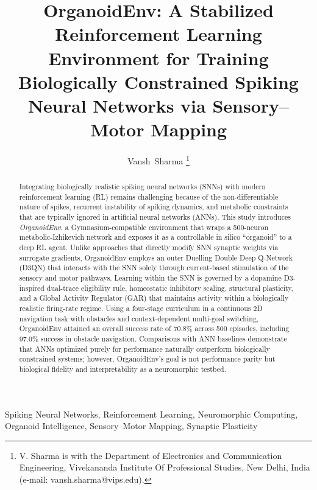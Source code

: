 \documentclass[journal]{IEEEtran}
\begin{document}
\title{OrganoidEnv: A Stabilized Reinforcement Learning Environment for Training Biologically Constrained Spiking Neural Networks via Sensory--Motor Mapping}

\author{Vansh~Sharma%
\thanks{V. Sharma is with the Department of Electronics and Communication Engineering, Vivekananda Institute Of Professional Studies, New Delhi, India (e-mail: vansh.sharma@vips.edu).}
}

\maketitle

\begin{abstract}
Integrating biologically realistic spiking neural networks (SNNs) with modern reinforcement learning (RL) remains challenging because of the non-differentiable nature of spikes, recurrent instability of spiking dynamics, and metabolic constraints that are typically ignored in artificial neural networks (ANNs).
This study introduces \emph{OrganoidEnv}, a Gymnasium-compatible environment that wraps a 500-neuron metabolic-Izhikevich network and exposes it as a controllable in silico ``organoid'' to a deep RL agent.
Unlike approaches that directly modify SNN synaptic weights via surrogate gradients, OrganoidEnv employs an outer Duelling Double Deep Q-Network (D3QN) that interacts with the SNN solely through current-based stimulation of the sensory and motor pathways.
Learning within the SNN is governed by a dopamine D3-inspired dual-trace eligibility rule, homeostatic inhibitory scaling, structural plasticity, and a Global Activity Regulator (GAR) that maintains activity within a biologically realistic firing-rate regime.
Using a four-stage curriculum in a continuous 2D navigation task with obstacles and context-dependent multi-goal switching, OrganoidEnv attained an overall success rate of 70.8\% across 500 episodes, including 97.0\% success in obstacle navigation.
Comparisons with ANN baselines demonstrate that ANNs optimized purely for performance naturally outperform biologically constrained systems; however, OrganoidEnv's goal is not performance parity but biological fidelity and interpretability as a neuromorphic testbed.
\end{abstract}

\begin{IEEEkeywords}
Spiking Neural Networks, Reinforcement Learning, Neuromorphic Computing, Organoid Intelligence, Sensory--Motor Mapping, Synaptic Plasticity
\end{IEEEkeywords}
\end{document}
